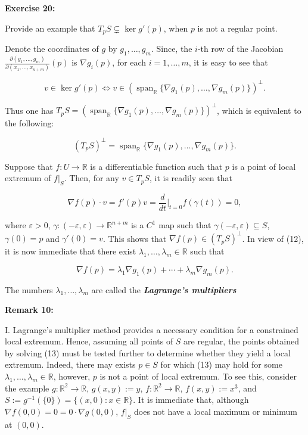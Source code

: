 \documentclass{book}
\begin{document}
\textbf{Exercise 20:}

Provide an example that $T_p S \subsetneq \ker g'(p)$, when $p$ is not a regular point.

Denote the coordinates of $g$ by $g_1, \ldots, g_m$. Since, the $i$-th row of the Jacobian $\frac{\partial (g_1,\ldots,g_m)}{\partial (x_1,\ldots,x_{n+m})}(p)$ is $\nabla g_i(p)$, for each $i = 1, \ldots, m$, it is easy to see that

\[
v \in \ker g'(p) \Longleftrightarrow v \in (\operatorname{span}_{\mathbb{R}}\{\nabla g_1(p), \ldots, \nabla g_m(p)\})^\perp.
\]

Thus one has $T_p S = (\operatorname{span}_{\mathbb{R}}\{\nabla g_1(p), \ldots, \nabla g_m(p)\})^\perp$, which is equivalent to the following:

\[
(T_p S)^\perp = \operatorname{span}_{\mathbb{R}}\{\nabla g_1(p), \ldots, \nabla g_m(p)\}.
\tag{12}
\]

Suppose that $f : U \to \mathbb{R}$ is a differentiable function such that $p$ is a point of local extremum of $f|_S$. Then, for any $v \in T_p S$, it is readily seen that

\[
\nabla f(p) \cdot v = f'(p)v = \frac{d}{dt}\Big|_{t=0} f(\gamma(t)) = 0,
\]

where $\varepsilon > 0$, $\gamma : (-\varepsilon, \varepsilon) \to \mathbb{R}^{n+m}$ is a $C^1$ map such that $\gamma(-\varepsilon, \varepsilon) \subseteq S$, $\gamma(0) = p$ and $\gamma'(0) = v$. This shows that $\nabla f(p) \in (T_p S)^\perp$. In view of (12), it is now immediate that there exist $\lambda_1, \ldots, \lambda_m \in \mathbb{R}$ such that

\[
\nabla f(p) = \lambda_1 \nabla g_1(p) + \cdots + \lambda_m \nabla g_m(p).
\tag{13}
\]

The numbers $\lambda_1, \ldots, \lambda_m$ are called the \textbf{\textit{Lagrange's multipliers}}


\textbf{Remark 10:}

I. Lagrange's multiplier method provides a necessary condition for a constrained local extremum. Hence, assuming all points of $S$ are regular, the points obtained by solving (13) must be tested further to determine whether they yield a local extremum. Indeed, there may exists $p \in S$ for which (13) may hold for some $\lambda_1, \ldots, \lambda_m \in \mathbb{R}$, however, $p$ is not a point of local extremum. To see this, consider the example $g : \mathbb{R}^2 \to \mathbb{R}$, $g(x, y) := y$, $f : \mathbb{R}^2 \to \mathbb{R}$, $f(x, y) := x^3$, and $S := g^{-1}(\{0\}) = \{(x, 0) : x \in \mathbb{R}\}$. It is immediate that, although $\nabla f(0, 0) = 0 = 0 \cdot \nabla g(0, 0)$, $f|_S$ does not have a local maximum or minimum at $(0, 0)$.
\end{document}
